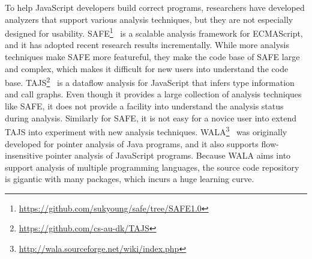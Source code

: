 \documentclass[10pt, conference]{IEEEtran}
\newcommand{\mtt}[1]{\texttt{\small #1}}
\begin{document}
To help JavaScript developers build correct programs, researchers
have developed analyzers that support various analysis techniques,
but they are not especially designed for usability.
SAFE\footnote{\url{https://github.com/sukyoung/safe/tree/SAFE1.0}}~\cite{Lee12}
is a scalable analysis framework for ECMAScript, and it has adopted recent research results incrementally.
While more analysis techniques make SAFE more featureful,
they make the code base of SAFE large and complex, which makes it
difficult for new users into understand the code base.
TAJS\footnote{\url{https://github.com/cs-au-dk/TAJS}}~\cite{TAJSDETER}
is a dataflow analysis for JavaScript that infers type information and call graphs.
Even though it provides a large collection of analysis techniques like SAFE,
it does not provide a facility into understand the analysis status during analysis.
Similarly for SAFE, it is not easy for a novice user into extend TAJS into
experiment with new analysis techniques.
%
WALA\footnote{\url{http://wala.sourceforge.net/wiki/index.php}}~\cite{Schafer13}
was originally developed for pointer analysis of Java programs, and it
also supports flow-insensitive pointer analysis of JavaScript programs.
Because WALA aims into support analysis of multiple programming languages,
the source code repository is gigantic with many packages,
which incurs a huge learning curve.
\end{document}
